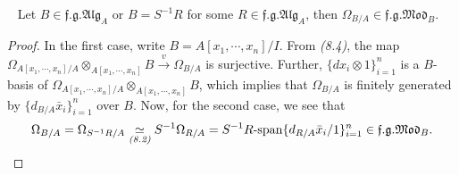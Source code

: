 \documentclass[11pt,a4paper,footinclude=true,headinclude=true]{scrbook} %
\newcommand{\<}{\langle}
\newcommand{\>}{\rangle}
\newcommand{\spn}{\mathchar`-\mathrm{span}}
\newcommand{\fg}{\mathfrak{f.g.}}
\newcommand{\MOD}{\mathfrak{Mod}}
\newcommand{\ALG}{\mathfrak{Alg}}
\newenvironment{corollary}[2][]
{\renewcommand\theinnercustomcol{#2}\innercustomcol[#1]
\begin{mdframed}[backgroundcolor=gray!20]\ }
{\end{mdframed}\endinnercustomcol}
\begin{document}
\begin{corollary}{8.5}
    Let $B\in\fg\ALG_A$ or $B=S^{-1}R$ for some $R\in\fg\ALG_A$, then $\Omega_{B/A}\in\fg\MOD_B$.
\end{corollary}
\begin{proof}
    In the first case, write $B=A[x_1,\cdots,x_n]/I$. From \textit{(8.4)}, the map $\Omega_{A[x_1,\cdots,x_n]/A}\otimes_{A[x_1,\cdots,x_n]}B\xrightarrow{v}\Omega_{B/A}$ is surjective. Further, $\{dx_i\otimes1\}_{i=1}^n$ is a $B$-basis of $\Omega_{A[x_1,\cdots,x_n]/A}\otimes_{A[x_1,\cdots,x_n]}B$, which implies that $\Omega_{B/A}$ is finitely generated by $\{d_{B/A}\bar{x}_i\}_{i=1}^n$ over $B$. Now, for the second case, we see that
    \begin{align*}
        \Omega_{B/A}=\Omega_{S^{-1}R/A}\underset{\textit{(8.2)}}{\simeq}S^{-1}\Omega_{R/A}=S^{-1}R\spn\{d_{R/A}\bar{x}_i/1\}_{i=1}^n\in\fg\MOD_B.
    \end{align*}
\end{proof}
\end{document}
